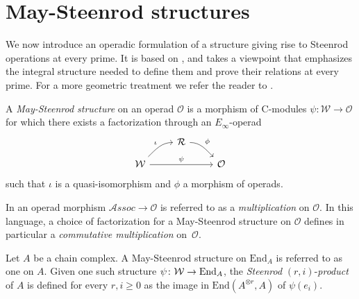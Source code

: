 
\section{May-Steenrod structures}

We now introduce an operadic formulation of a structure giving rise to Steenrod operations at every prime. It is based on \cites{steenrod47products, steenrod53symmetric, steenrod53cyclic, may70generalapproach}, and takes a viewpoint that emphasizes the integral structure needed to define them and prove their relations at every prime. For a more geometric treatment we refer the reader to \cites{may72geometry, may76homology, lawson2020n}.

\begin{definition} \label{def: May-Steenrod structure}
	A \textit{May-Steenrod structure} on an operad $\mathcal O$ is a 
	morphism of $\mathrm{C}$-modules $\psi \colon \mathcal W \to \mathcal O$ for which there exists a factorization through an $E_\infty$-operad
	\begin{equation*}
	\begin{tikzcd}[column sep = normal, row sep = small]
	& \mathcal R \arrow[dr, "\phi", out=0] & \\
	\mathcal W \arrow[ur, "\iota", in=180] \arrow[rr, "\psi"] & & \mathcal O
	\end{tikzcd}
	\end{equation*}
	such that $\iota$ is a quasi-isomorphism and $\phi$ a morphism of operads.
\end{definition}

\begin{remark} \label{rmk: Deligne conjecture}
	In \cite{GerstenhaberVoronov} an operad morphism $\mathcal{A}ssoc \to \mathcal O$ is referred to as a \textit{multiplication} on $\mathcal O$. In this language, a choice of factorization for a May-Steenrod structure on $\mathcal O$ defines in particular a \textit{commutative multiplication} on~$\mathcal O$.
\end{remark}

\begin{definition} \label{def: Steenrod products}
	Let $A$ be a chain complex.
	A May-Steenrod structure on $\mathrm{End}_A$ is referred to as one on $A$.
	Given one such structure $\psi \colon \mathcal W \to \mathrm{End}_A$, the \textit{Steenrod} $(r, i)$-\textit{product} of $A$ is defined for every $r, i \geq 0$ as the image in $ \mathrm{End}(A^{\otimes r}, A)$ of $\psi(e_i)$.
\end{definition}

